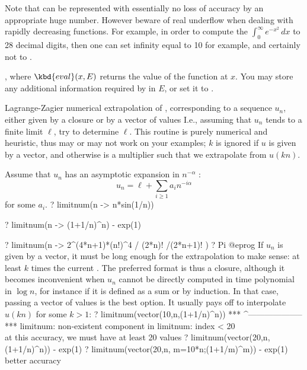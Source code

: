 Note that  can be represented with essentially no loss of
accuracy by an appropriate huge number. However beware of real underflow
when dealing with rapidly decreasing functions. For example, in order to
compute the $\int_0^\infty e^{-x^2}\,dx$ to 28 decimal digits, then one can
set infinity equal to 10 for example, and certainly not to .

,
where $\kbd{eval}(x, E)$ returns the value of the function at $x$.
You may store any additional information required by  in $E$, or set
it to .

\label{se:limitnum}
Lagrange-Zagier numerical extrapolation of , corresponding to a
sequence
$u_n$, either given by a closure  or by a vector of values
I.e., assuming that $u_n$ tends to a finite limit $\ell$, try to determine
$\ell$. This routine is purely numerical and heuristic, thus may or may not
work on your examples; $k$ is ignored if $u$ is given by a vector,
and otherwise is a multiplier such that we extrapolate from $u(kn)$.

Assume that $u_n$ has an asymptotic expansion in $n^{-\alpha}$ :
$$u_n = \ell + \sum_{i\geq 1} a_i n^{-i\alpha}$$
for some $a_i$.
\bprog
? limitnum(n -> n*sin(1/n))

? limitnum(n -> (1+1/n)^n) - exp(1)

? limitnum(n -> 2^(4*n+1)*(n!)^4 / (2*n)! /(2*n+1)! )
? Pi
@eprog\noindent
If $u_n$ is given by a vector, it must be long enough for the extrapolation
to make sense: at least $k$ times the current . The
preferred format is thus a closure, although it becomes inconvenient
when $u_n$ cannot be directly computed in time polynomial in $\log n$,
for instance if it is defined as a sum or by induction. In that case,
passing a vector of values is the best option. It usually pays off to
interpolate $u(kn)$ for some $k > 1$:
\bprog
? limitnum(vector(10,n,(1+1/n)^n))
 ***                 ^--------------------
 *** limitnum: non-existent component in limitnum: index < 20
\\ at this accuracy, we must have at least 20 values
? limitnum(vector(20,n,(1+1/n)^n)) - exp(1)
? limitnum(vector(20,n, m=10*n;(1+1/m)^m)) - exp(1) \\ better accuracy

